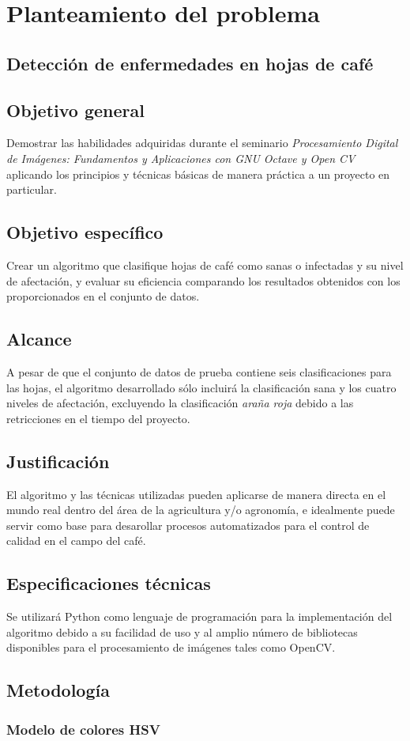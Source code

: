 \chapter{Planteamiento del problema}

\section{Detección de enfermedades en hojas de café}

\section{Objetivo general}
Demostrar las habilidades adquiridas durante el seminario \textit{Procesamiento Digital de Imágenes: Fundamentos y Aplicaciones con GNU Octave y Open CV} aplicando los principios y técnicas básicas de manera práctica a un proyecto en particular.

\section{Objetivo específico}
Crear un algoritmo que clasifique hojas de café como sanas o infectadas y su nivel de afectación, y evaluar su eficiencia comparando los resultados obtenidos con los proporcionados en el conjunto de datos.

\section{Alcance}
A pesar de que el conjunto de datos de prueba contiene seis clasificaciones para las hojas, el algoritmo desarrollado sólo incluirá la clasificación sana y los cuatro niveles de afectación, excluyendo la clasificación \textit{araña roja} debido a las retricciones en el tiempo del proyecto.

\section{Justificación}
El algoritmo y las técnicas utilizadas pueden aplicarse de manera directa en el mundo real dentro del área de la agricultura y/o agronomía, e idealmente puede servir como base para desarollar procesos automatizados para el control de calidad en el campo del café.
 
\section{Especificaciones técnicas}
Se utilizará Python como lenguaje de programación para la implementación del algoritmo debido a su facilidad de uso y al amplio número de bibliotecas disponibles para el procesamiento de imágenes tales como OpenCV.

\section{Metodología}

\subsection{Modelo de colores HSV}